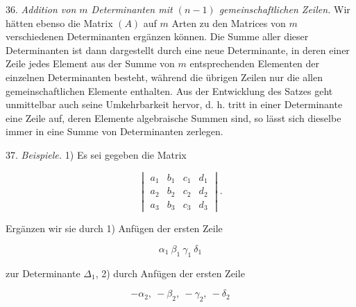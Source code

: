 \documentclass[11pt]{article}
\let\Delta\varDelta
\begin{document}
36. \textit{Addition von $m$ Determinanten mit $(n-1)$ gemeinschaftlichen
Zeilen.} Wir hätten ebenso die Matrix $(A)$ auf $m$ Arten zu den
Matrices von $m$ verschiedenen Determinanten ergänzen können. Die Summe
aller dieser Determinanten ist dann dargestellt durch eine neue
Determinante, in deren einer Zeile jedes Element aus der Summe von $m$
entsprechenden Elementen der einzelnen Determinanten besteht, während
die übrigen Zeilen nur die allen gemeinschaftlichen Elemente enthalten.
Aus der Entwicklung des Satzes geht unmittelbar auch seine
Umkehrbarkeit hervor, d. h. tritt in einer Determinante eine Zeile auf,
deren Elemente algebraische Summen sind, so lässt sich dieselbe immer
in eine Summe von Determinanten zerlegen.

37. \textit{Beispiele.} 1) Es sei gegeben die Matrix

\[
\begin{vmatrix}
a_1 & b_1 & c_1 & d_1 \\
a_2 & b_2 & c_2 & d_2 \\
a_3 & b_3 & c_3 & d_3
\end{vmatrix}.
\]

Ergänzen wir sie durch 1) Anfügen der ersten Zeile

\[
\alpha_1\ \beta_1\ \gamma_1\ \delta_1
\]

zur Determinante $\Delta_1$, 2) durch Anfügen der ersten Zeile

\[
-\alpha_2,\ -\beta_2,\ -\gamma_2,\ -\delta_2
\]
\end{document}
